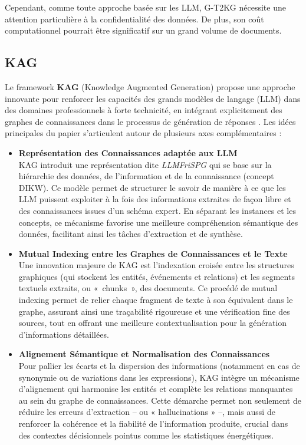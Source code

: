 \documentclass[a4paper,11pt]{report}
\providecommand{\tightlist}{\setlength{\itemsep}{0pt}\setlength{\parskip}{0pt}}
\begin{document}
Cependant, comme toute approche basée sur les LLM, G-T2KG nécessite une attention particulière à la confidentialité des données. De plus, son coût computationnel pourrait être significatif sur un grand volume de documents.

\subsection{KAG}\label{kag}

Le framework \textbf{KAG} (Knowledge Augmented Generation) propose une approche innovante pour renforcer les capacités des grands modèles de langage (LLM) dans des domaines professionnels à forte technicité, en intégrant explicitement des graphes de connaissances dans le processus de génération de réponses \citep{74SRYH2Q}. Les idées principales du papier s'articulent autour de plusieurs axes complémentaires :

\begin{itemize}
\tightlist
\item
  \textbf{Représentation des Connaissances adaptée aux LLM}\\
  KAG introduit une représentation dite \emph{LLMFriSPG} qui se base sur la hiérarchie des données, de l'information et de la connaissance (concept DIKW). Ce modèle permet de structurer le savoir de manière à ce que les LLM puissent exploiter à la fois des informations extraites de façon libre et des connaissances issues d'un schéma expert. En séparant les instances et les concepts, ce mécanisme favorise une meilleure compréhension sémantique des données, facilitant ainsi les tâches d'extraction et de synthèse.
\end{itemize}

\begin{itemize}
\tightlist
\item
  \textbf{Mutual Indexing entre les Graphes de Connaissances et le Texte}\\
  Une innovation majeure de KAG est l'indexation croisée entre les structures graphiques (qui stockent les entités, événements et relations) et les segments textuels extraits, ou «~chunks~», des documents. Ce procédé de mutual indexing permet de relier chaque fragment de texte à son équivalent dans le graphe, assurant ainsi une traçabilité rigoureuse et une vérification fine des sources, tout en offrant une meilleure contextualisation pour la génération d'informations détaillées.
\item
  \textbf{Alignement Sémantique et Normalisation des Connaissances}\\
  Pour pallier les écarts et la dispersion des informations (notamment en cas de synonymie ou de variations dans les expressions), KAG intègre un mécanisme d'alignement qui harmonise les entités et complète les relations manquantes au sein du graphe de connaissances. Cette démarche permet non seulement de réduire les erreurs d'extraction -- ou « hallucinations » --, mais aussi de renforcer la cohérence et la fiabilité de l'information produite, crucial dans des contextes décisionnels pointus comme les statistiques énergétiques.
\end{itemize}
\end{document}
